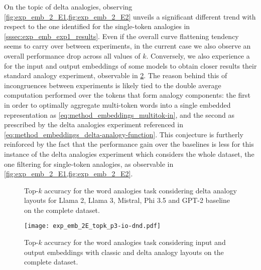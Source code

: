 On the topic of delta analogies, observing \cref{fig:exp_emb_2_E1,fig:exp_emb_2_E2} unveils a significant different trend with respect to the one identified for the single-token analogies in \cref{sssec:exp_emb_exp1_results}.
Even if the overall curve flattening tendency seems to carry over between experiments, in the current case we also observe an overall performance drop across all values of $k$.
Conversely, we also experience a  for the input and output embeddings of some models to obtain closer results  their standard analogy experiment, observable in \cref{fig:exp_emb_2_E3}.
The reason behind this  of incongruences between experiments is likely tied to the double average computation performed over the tokens that form analogy components: the first in order to optimally aggregate multi-token words into a single embedded representation as \cref{eq:method_embeddings_multitok-in}, and the second as prescribed by the delta analogies experiment referenced in \cref{eq:method_embeddings_delta-analogy-function}.
This conjecture is furtherly reinforced by the fact that the performance gain over the baselines is less  for this instance of the delta analogies experiment which considers the whole dataset,  the one filtering for single-token analogies, as observable in \cref{fig:exp_emb_2_E1,fig:exp_emb_2_E2}.

\begin{figure}[t!]
    \centering
    \caption[Top-$k$ accuracy for the word analogies task considering delta analogy layouts for various models on the complete dataset.]{Top-$k$ accuracy for the word analogies task considering delta analogy layouts for Llama 2, Llama 3, Mistral, Phi 3.5 and GPT-2 baseline on the complete dataset.}
    \label{fig:exp_emb_2_E}
\end{figure}
\begin{figure}[t!]
    \centering
    \texttt{[image: exp\_emb\_2E\_topk\_p3-io-dnd.pdf]}
    \caption{Top-$k$ accuracy for the word analogies task considering input and output embeddings with classic and delta analogy layouts on the complete dataset.}
    \label{fig:exp_emb_2_E3}
\end{figure}


